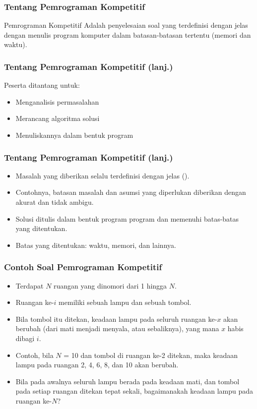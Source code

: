 \begin{frame}
\frametitle{Tentang Pemrograman Kompetitif}
\begin{block}{Pemrograman Kompetitif}
Adalah penyelesaian soal yang terdefinisi dengan jelas dengan menulis program komputer dalam batasan-batasan tertentu (memori dan waktu).
\end{block}
\end{frame}

\begin{frame}
\frametitle{Tentang Pemrograman Kompetitif (lanj.)}
Peserta ditantang untuk:
\begin{itemize}
  \item Menganalisis permasalahan
  \item Merancang algoritma solusi
  \item Menuliskannya dalam bentuk program
\end{itemize}
\end{frame}

\begin{frame}
\frametitle{Tentang Pemrograman Kompetitif (lanj.)}
\begin{itemize}
  \item Masalah yang diberikan selalu terdefinisi dengan jelas ().
  \item Contohnya, batasan masalah dan asumsi yang diperlukan diberikan dengan akurat dan tidak ambigu.
  \item Solusi ditulis dalam bentuk program program dan memenuhi batas-batas yang ditentukan.
  \item Batas yang ditentukan: waktu, memori, dan lainnya.
\end{itemize}
\end{frame}

\begin{frame}
\frametitle{Contoh Soal Pemrograman Kompetitif}
\begin{itemize}
  \item Terdapat $N$ ruangan yang dinomori dari 1 hingga $N$.
  \item Ruangan ke-$i$ memiliki sebuah lampu dan sebuah tombol.
  \item Bila tombol itu ditekan, keadaan lampu pada seluruh ruangan ke-$x$ akan berubah (dari mati menjadi menyala, atau sebaliknya), yang mana $x$ habis dibagi $i$.
  \item Contoh, bila $N$ = 10 dan tombol di ruangan ke-2 ditekan, maka keadaan lampu pada ruangan 2, 4, 6, 8, dan 10 akan berubah.
  \item Bila pada awalnya seluruh lampu berada pada keadaan mati, dan tombol pada setiap ruangan ditekan tepat sekali, bagaimanakah keadaan lampu pada ruangan ke-$N$?
\end{itemize}
\end{frame}

